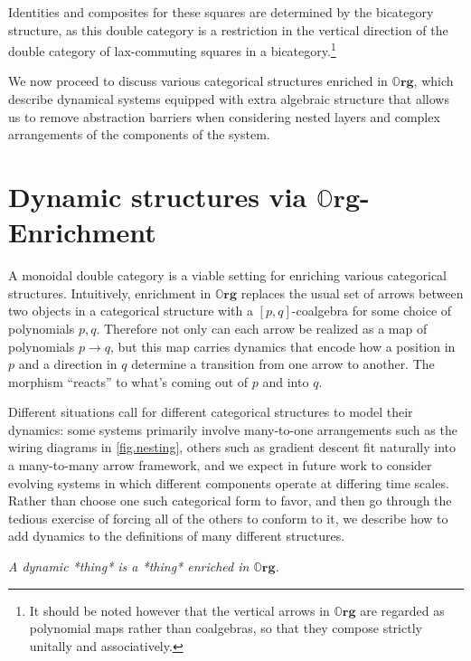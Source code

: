 \documentclass[11pt, one side, article]{memoir}
\theoremstyle{definition}
\theoremstyle{plain}
\newcommand{\Cat}[1]{\mathbf{#1}}%
\newcommand{\0}{\textsf{0}}
\newcommand{\1}{\tn{\textsf{1}}}
\newcommand{\slogan}[1]{\begin{center}\textit{#1}\end{center}}
\newcommand{\org}{{\mathbb{O}\Cat{rg}}}
\begin{document}
Identities and composites for these squares are determined by the bicategory structure, as this double category is a restriction in the vertical direction of the double category of lax-commuting squares in a bicategory.\footnote{It should be noted however that the vertical arrows in $\org$ are regarded as polynomial maps rather than coalgebras, so that they compose strictly unitally and associatively.}

We now proceed to discuss various categorical structures enriched in $\org$, which describe dynamical systems equipped with extra algebraic structure that allows us to remove abstraction barriers when considering nested layers and complex arrangements of the components of the system.


\chapter{Dynamic structures via $\org$-Enrichment}


A monoidal double category is a viable setting for enriching various categorical structures. Intuitively, enrichment in $\org$ replaces the usual set of arrows between two objects in a categorical structure with a $[p,q]$-coalgebra for some choice of polynomials $p,q$. Therefore not only can each arrow be realized as a map of polynomials $p \to q$, but this map carries dynamics that encode how a position in $p$ and a direction in $q$ determine a transition from one arrow to another. The morphism ``reacts'' to what's coming out of $p$ and into $q$.

Different situations call for different categorical structures to model their dynamics: some systems primarily involve many-to-one arrangements such as the wiring diagrams in \cref{fig.nesting}, others such as gradient descent fit naturally into a many-to-many arrow framework, and we expect in future work to consider evolving systems in which different components operate at differing time scales. Rather than choose one such categorical form to favor, and then go through the tedious exercise of forcing all of the others to conform to it, we describe how to add dynamics to the definitions of many different structures.

\slogan{A dynamic *thing* is a *thing* enriched in $\org$.}
\end{document}
